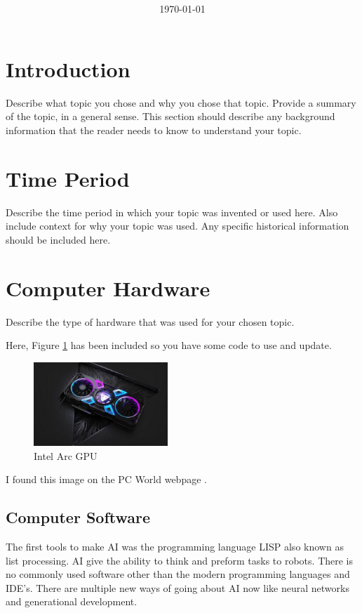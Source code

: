 \documentclass[11pt, twocolumn]{article}
\title{{\large } \thetitle}
\author{\theauthor}
\date{\today}
\begin{document}
\maketitle

\thispagestyle{firstpage}

\section{Introduction}
Describe what topic you chose and why you chose that topic. Provide a summary of
the topic, in a general sense. This section should describe any background 
information that the reader needs to know to understand your topic.

\section{Time Period}
Describe the time period in which your topic was invented or used here. Also include
context for why your topic was used. Any specific historical information should be 
included here.

\section{Computer Hardware}
Describe the type of hardware that was used for your chosen topic.

Here, Figure \ref{fig:gpu} has been included so you have some code to use and update.
\begin{figure}
    \centering
    \includegraphics[width=0.45\textwidth]{gpu}
    \caption{Intel Arc GPU}
    \label{fig:gpu}
\end{figure}

I found this image on the PC World webpage \cite{Ung21}. 

\subsection{Computer Software}
The first tools to make AI was the programming language LISP also known as list processing. AI give the ability to think and preform tasks to robots. There is no commonly used software other than the modern programming languages and IDE's. There are multiple new ways of going about AI now like neural networks and generational development.
\end{document}

